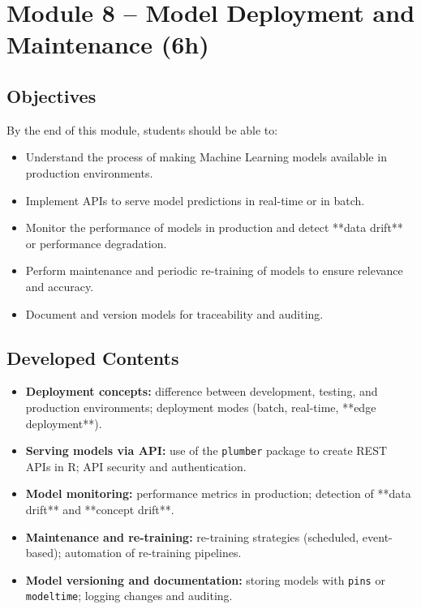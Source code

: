 \section{\textcolor{sectionred}{Module 8 – Model Deployment and Maintenance (6h)}}

\subsection{\textcolor{subsectionblue}{Objectives}}
By the end of this module, students should be able to:
\begin{itemize}
  \item Understand the process of making Machine Learning models available in production environments.  
  \item Implement APIs to serve model predictions in real-time or in batch.  
  \item Monitor the performance of models in production and detect **data drift** or performance degradation.  
  \item Perform maintenance and periodic re-training of models to ensure relevance and accuracy.  
  \item Document and version models for traceability and auditing.
\end{itemize}

\subsection{\textcolor{subsectionblue}{Developed Contents}}
\begin{itemize}
  \item \textbf{Deployment concepts:} difference between development, testing, and production environments; deployment modes (batch, real-time, **edge deployment**).
  \item \textbf{Serving models via API:} use of the \texttt{plumber} package to create REST APIs in R; API security and authentication.
  \item \textbf{Model monitoring:} performance metrics in production; detection of **data drift** and **concept drift**.
  \item \textbf{Maintenance and re-training:} re-training strategies (scheduled, event-based); automation of re-training pipelines.
  \item \textbf{Model versioning and documentation:} storing models with \texttt{pins} or \texttt{modeltime}; logging changes and auditing.
\end{itemize}

